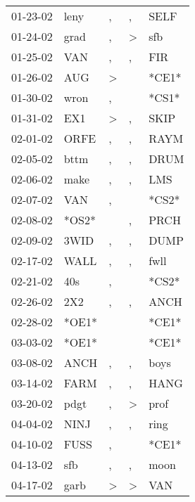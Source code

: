 \begin{supertabular}{lllll}
 01-23-02 &   leny &                , &             , &   SELF \\
 01-24-02 &   grad &                , &  \textgreater &    sfb \\
 01-25-02 &    VAN &                , &             , &    FIR \\
 01-26-02 &    AUG &     \textgreater &               &  *CE1* \\
 01-30-02 &   wron &                , &               &  *CS1* \\
 01-31-02 &    EX1 &     \textgreater &             , &   SKIP \\
 02-01-02 &   ORFE &                , &             , &   RAYM \\
 02-05-02 &   bttm &                , &             , &   DRUM \\
 02-06-02 &   make &                , &             , &    LMS \\
 02-07-02 &    VAN &                , &               &  *CS2* \\
 02-08-02 &  *OS2* &                  &             , &   PRCH \\
 02-09-02 &   3WID &                , &             , &   DUMP \\
 02-17-02 &   WALL &                , &             , &   fwll \\
 02-21-02 &    40s &                , &               &  *CS2* \\
 02-26-02 &    2X2 &                , &             , &   ANCH \\
 02-28-02 &  *OE1* &                  &               &  *CE1* \\
 03-03-02 &  *OE1* &                  &               &  *CE1* \\
 03-08-02 &   ANCH &                , &             , &   boys \\
 03-14-02 &   FARM &                , &             , &   HANG \\
 03-20-02 &   pdgt &                , &  \textgreater &   prof \\
 04-04-02 &   NINJ &                , &             , &   ring \\
 04-10-02 &   FUSS &                , &               &  *CE1* \\
 04-13-02 &    sfb &                , &             , &   moon \\
 04-17-02 &   garb &     \textgreater &  \textgreater &    VAN \\

\end{supertabular}
